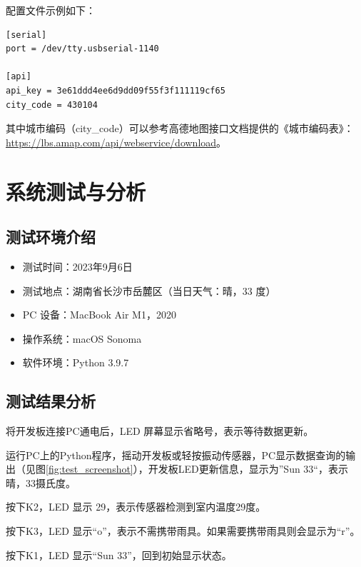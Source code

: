 \documentclass{article}
\begin{document}
配置文件示例如下：

\begin{verbatim}
[serial]
port = /dev/tty.usbserial-1140

[api]
api_key = 3e61ddd4ee6d9dd09f55f3f111119cf65
city_code = 430104
\end{verbatim}

其中城市编码（city\_code）可以参考高德地图接口文档提供的《城市编码表》：\url{https://lbs.amap.com/api/webservice/download}。

\section{系统测试与分析}

\subsection{测试环境介绍}

\begin{itemize}
  \item 测试时间：2023年9月6日
  \item 测试地点：湖南省长沙市岳麓区（当日天气：晴，33 度）
  \item PC 设备：MacBook Air M1，2020
  \item 操作系统：macOS Sonoma
  \item 软件环境：Python 3.9.7
\end{itemize}

\subsection{测试结果分析}

将开发板连接PC通电后，LED 屏幕显示省略号，表示等待数据更新。

运行PC上的Python程序，摇动开发板或轻按振动传感器，PC显示数据查询的输出（见图\ref{fig:test_screenshot}），开发板LED更新信息，显示为”Sun 33“，表示晴，33摄氏度。

按下K2，LED 显示 29，表示传感器检测到室内温度29度。

按下K3，LED 显示“o”，表示不需携带雨具。如果需要携带雨具则会显示为“r”。

按下K1，LED 显示“Sun 33”，回到初始显示状态。
\end{document}
